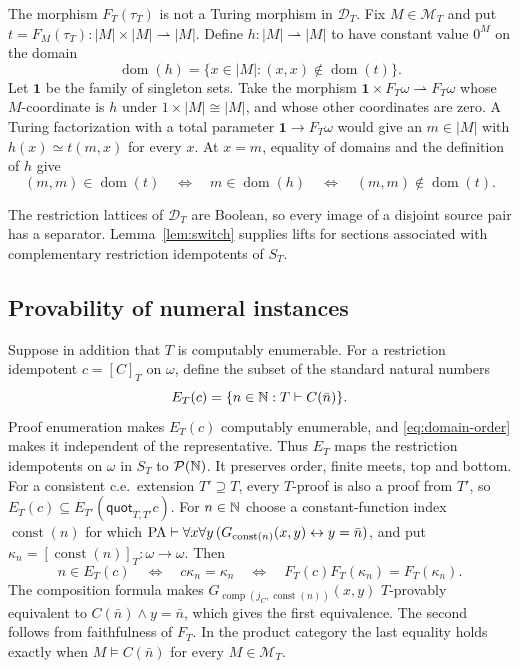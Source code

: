 The morphism $F_T(\tau_T)$ is not a Turing morphism in $\mathcal D_T$.
Fix $M\in\mathcal M_T$ and put
$t=F_M(\tau_T):|M|\times|M|\rightharpoonup |M|$.
Define $h:|M|\rightharpoonup|M|$ to have constant value $0^M$ on
the domain
\[
 \operatorname{dom}(h)=\{x\in|M|:(x,x)\notin\operatorname{dom}(t)\}.
\]
Let $\mathbf1$ be the family of singleton sets. Take the morphism
$\mathbf1\times F_T\omega\rightharpoonup F_T\omega$ whose
$M$-coordinate is $h$ under $1\times|M|\cong|M|$, and whose other
coordinates are zero. A Turing factorization with a total parameter
$\mathbf1\to F_T\omega$ would give an $m\in|M|$ with
$h(x)\simeq t(m,x)$ for every $x$. At $x=m$, equality of domains and the
definition of $h$ give
\[
 (m,m)\in\operatorname{dom}(t)
 \quad\Longleftrightarrow\quad m\in\operatorname{dom}(h)
 \quad\Longleftrightarrow\quad (m,m)\notin\operatorname{dom}(t).
\]

The restriction lattices of $\mathcal D_T$ are Boolean, so every image
of a disjoint source pair has a separator. Lemma~\ref{lem:switch}
supplies lifts for sections associated with complementary restriction
idempotents of $S_T$.


\subsection{Provability of numeral instances}

Suppose in addition that $T$ is computably enumerable.
For a restriction idempotent
$c=[C]_T$ on $\omega$, define the subset of the standard natural numbers
\begin{equation}\label{eq:observation}
 E_T(c)=\{n\in\mathbb N:T\vdash C(\bar n)\}.
\end{equation}
Proof enumeration makes $E_T(c)$ computably enumerable, and
\eqref{eq:domain-order} makes it independent of the representative.
Thus $E_T$ maps the restriction idempotents on $\omega$ in $S_T$
to $\mathcal P(\mathbb N)$. It preserves order, finite meets, top and
bottom. For a consistent c.e.\ extension $T'\supseteq T$, every
$T$-proof is also a proof from $T'$, so
$E_T(c)\subseteq E_{T'}(\mathsf{quot}_{T,T'}c)$. For $n\in\mathbb N$ choose a constant-function index
$\operatorname{const}(n)$ for which
$\mathrm{PA}\vdash\forall x\forall y\,
(G_{\operatorname{const}(n)}(x,y)\leftrightarrow y=\bar n)$, and put
$\kappa_n=[\operatorname{const}(n)]_T:\omega\to\omega$. Then
\begin{equation}\label{eq:faithful-observation}
 n\in E_T(c)
 \quad\Longleftrightarrow\quad c\kappa_n=\kappa_n
 \quad\Longleftrightarrow\quad
 F_T(c)F_T(\kappa_n)=F_T(\kappa_n).
\end{equation}
The composition formula makes
$G_{\operatorname{comp}(j_C,\operatorname{const}(n))}(x,y)$
$T$-provably equivalent to $C(\bar n)\land y=\bar n$, which gives
the first equivalence.
The second follows from faithfulness of $F_T$. In the product
category the last equality holds exactly when
$M\models C(\bar n)$ for every $M\in\mathcal M_T$.

